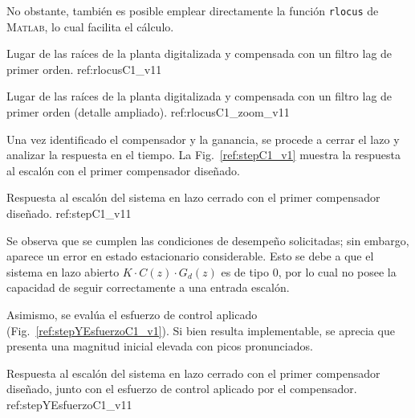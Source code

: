 No obstante, tambi\'en es posible emplear directamente la funci\'on \texttt{rlocus} de \textsc{Matlab}, lo cual facilita el c\'alculo.  

{Lugar de las ra\'ices de la planta digitalizada y compensada con un filtro lag de primer orden.}
{ref:rlocusC1_v1}{1}

{Lugar de las ra\'ices de la planta digitalizada y compensada con un filtro lag de primer orden (detalle ampliado).}
{ref:rlocusC1_zoom_v1}{1}

Una vez identificado el compensador y la ganancia, se procede a cerrar el lazo y analizar la respuesta en el tiempo. La Fig.~\ref{ref:stepC1_v1} muestra la respuesta al escal\'on con el primer compensador dise\~nado.  

{Respuesta al escal\'on del sistema en lazo cerrado con el primer compensador dise\~nado.}
{ref:stepC1_v1}{1}

Se observa que se cumplen las condiciones de desempe\~no solicitadas; sin embargo, aparece un error en estado estacionario considerable. Esto se debe a que el sistema en lazo abierto $K \cdot C(z) \cdot G_d(z)$ es de tipo 0, por lo cual no posee la capacidad de seguir correctamente a una entrada escal\'on.  

Asimismo, se eval\'ua el esfuerzo de control aplicado (Fig.~\ref{ref:stepYEsfuerzoC1_v1}). Si bien resulta implementable, se aprecia que presenta una magnitud inicial elevada con picos pronunciados.  

{Respuesta al escal\'on del sistema en lazo cerrado con el primer compensador dise\~nado, junto con el esfuerzo de control aplicado por el compensador.}
{ref:stepYEsfuerzoC1_v1}{1}
\balance
\clearpage

